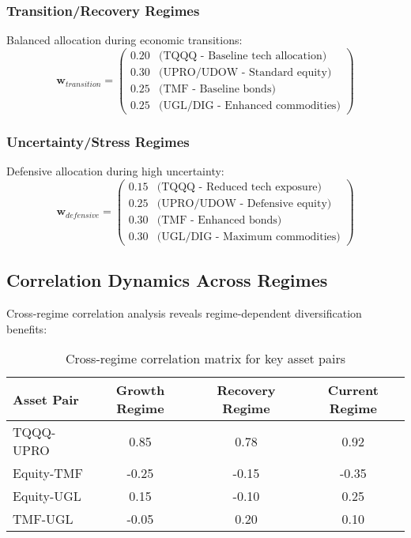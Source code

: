 \documentclass[onecolumn,ieee]{arithmaxresearch}
\begin{document}
\subsubsection{Transition/Recovery Regimes}
Balanced allocation during economic transitions:
\begin{equation}
\mathbf{w}_{transition} = \begin{pmatrix}
0.20 & \text{(TQQQ - Baseline tech allocation)} \\
0.30 & \text{(UPRO/UDOW - Standard equity)} \\
0.25 & \text{(TMF - Baseline bonds)} \\
0.25 & \text{(UGL/DIG - Enhanced commodities)}
\end{pmatrix}
\end{equation}

\subsubsection{Uncertainty/Stress Regimes}
Defensive allocation during high uncertainty:
\begin{equation}
\mathbf{w}_{defensive} = \begin{pmatrix}
0.15 & \text{(TQQQ - Reduced tech exposure)} \\
0.25 & \text{(UPRO/UDOW - Defensive equity)} \\
0.30 & \text{(TMF - Enhanced bonds)} \\
0.30 & \text{(UGL/DIG - Maximum commodities)}
\end{pmatrix}
\end{equation}

\subsection{Correlation Dynamics Across Regimes}

Cross-regime correlation analysis reveals regime-dependent diversification benefits:

\begin{table}[h]
\centering
\begin{tabular}{lccc}
\toprule
\textbf{Asset Pair} & \textbf{Growth Regime} & \textbf{Recovery Regime} & \textbf{Current Regime} \\
\midrule
TQQQ-UPRO & 0.85 & 0.78 & 0.92 \\
Equity-TMF & -0.25 & -0.15 & -0.35 \\
Equity-UGL & 0.15 & -0.10 & 0.25 \\
TMF-UGL & -0.05 & 0.20 & 0.10 \\
\bottomrule
\end{tabular}
\caption{Cross-regime correlation matrix for key asset pairs}
\end{table}
\end{document}
